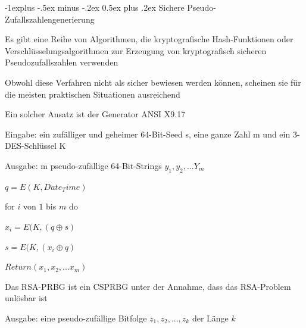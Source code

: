 \documentclass[a4paper]{article}
\makeatletter
\renewcommand{\subsection}{\@startsection{subsection}{2}{0mm}%
 {-1explus -.5ex minus -.2ex}%
 {0.5ex plus .2ex}%
 {\normalfont\normalsize\bfseries}}
\makeatother
\begin{document}
\begin{multicols}{3}
      \subsection{Sichere Pseudo-Zufallszahlengenerierung}
      \begin{itemize*}
            \item Es gibt eine Reihe von Algorithmen, die kryptografische Hash-Funktionen oder Verschlüsselungsalgorithmen zur Erzeugung von kryptografisch sicheren Pseudozufallszahlen verwenden
            \item Obwohl diese Verfahren nicht als sicher bewiesen werden können, scheinen sie für die meisten praktischen Situationen ausreichend
            \item Ein solcher Ansatz ist der Generator ANSI X9.17
            \begin{itemize*}
                  \item Eingabe: ein zufälliger und geheimer 64-Bit-Seed s, eine ganze Zahl m und ein 3-DES-Schlüssel K
                  \item Ausgabe: m pseudo-zufällige 64-Bit-Strings $y_1,y_2,...Y_m$
                  \begin{enumerate*}
                        \item $q = E(K, Date_Time)$
                        \item for $i$ von $1$ bis $m$ do
                        \begin{enumerate*}
                              \item $x_i = E(K, (q\oplus s)$
                              \item $s = E(K, (x_i\oplus q)$
                        \end{enumerate*}
                        \item $Return(x_1,x_2,...x_m)$
                  \end{enumerate*}
            \end{itemize*}
            \item Das RSA-PRBG ist ein CSPRBG unter der Annahme, dass das RSA-Problem unlösbar ist
            \begin{itemize*}
                  \item Ausgabe: eine pseudo-zufällige Bitfolge $z_1,z_2,...,z_k$ der Länge $k$

\end{itemize*}
\end{itemize*}
\end{multicols}
\end{document}
